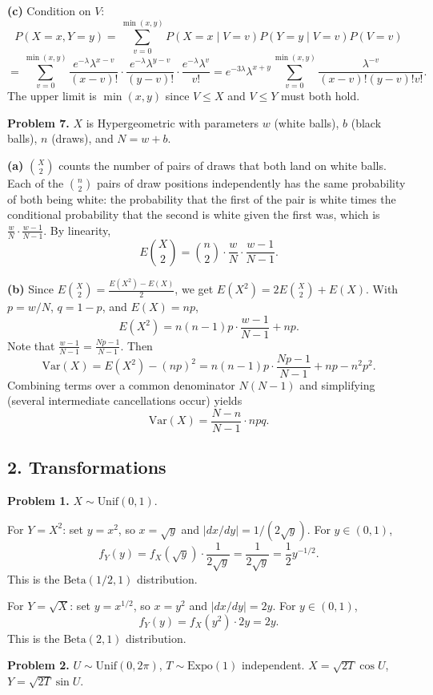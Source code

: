 \documentclass{article}
\begin{document}
\textbf{(c)} Condition on $V$:
$$
P(X=x,Y=y) = \sum_{v=0}^{\min(x,y)} P(X=x\mid V=v)P(Y=y\mid V=v)P(V=v)
$$
$$
= \sum_{v=0}^{\min(x,y)}\frac{e^{-\lambda}\lambda^{x-v}}{(x-v)!}\cdot\frac{e^{-\lambda}\lambda^{y-v}}{(y-v)!}\cdot\frac{e^{-\lambda}\lambda^v}{v!}
= e^{-3\lambda}\lambda^{x+y}\sum_{v=0}^{\min(x,y)}\frac{\lambda^{-v}}{(x-v)!(y-v)!v!}.
$$
The upper limit is $\min(x,y)$ since $V\le X$ and $V\le Y$ must both hold.

\bigskip
\textbf{Problem 7.} $X$ is Hypergeometric with parameters $w$ (white balls), $b$ (black balls), $n$ (draws), and $N=w+b$.

\textbf{(a)} $\binom{X}{2}$ counts the number of pairs of draws that both land on white balls. Each of the $\binom{n}{2}$ pairs of draw positions independently has the same probability of both being white: the probability that the first of the pair is white times the conditional probability that the second is white given the first was, which is $\frac{w}{N}\cdot\frac{w-1}{N-1}$. By linearity,
$$
E\!\binom{X}{2} = \binom{n}{2}\cdot\frac{w}{N}\cdot\frac{w-1}{N-1}.
$$

\textbf{(b)} Since $E\binom{X}{2}=\frac{E(X^2)-E(X)}{2}$, we get $E(X^2)=2E\binom{X}{2}+E(X)$. With $p=w/N$, $q=1-p$, and $E(X)=np$,
$$
E(X^2) = n(n-1)p\cdot\frac{w-1}{N-1}+np.
$$
Note that $\frac{w-1}{N-1}=\frac{Np-1}{N-1}$. Then
$$
\text{Var}(X)=E(X^2)-(np)^2 = n(n-1)p\cdot\frac{Np-1}{N-1}+np-n^2p^2.
$$
Combining terms over a common denominator $N(N-1)$ and simplifying (several intermediate cancellations occur) yields
$$
\text{Var}(X) = \frac{N-n}{N-1}\cdot npq.
$$

\subsection*{2. Transformations}

\textbf{Problem 1.} $X\sim\text{Unif}(0,1)$.

For $Y=X^2$: set $y=x^2$, so $x=\sqrt{y}$ and $|dx/dy|=1/(2\sqrt{y})$. For $y\in(0,1)$,
$$
f_Y(y) = f_X(\sqrt{y})\cdot\frac{1}{2\sqrt{y}} = \frac{1}{2\sqrt{y}} = \frac{1}{2}y^{-1/2}.
$$
This is the $\text{Beta}(1/2,1)$ distribution.

For $Y=\sqrt{X}$: set $y=x^{1/2}$, so $x=y^2$ and $|dx/dy|=2y$. For $y\in(0,1)$,
$$
f_Y(y) = f_X(y^2)\cdot 2y = 2y.
$$
This is the $\text{Beta}(2,1)$ distribution.

\bigskip
\textbf{Problem 2.} $U\sim\text{Unif}(0,2\pi)$, $T\sim\text{Expo}(1)$ independent. $X=\sqrt{2T}\cos U$, $Y=\sqrt{2T}\sin U$.
\end{document}
